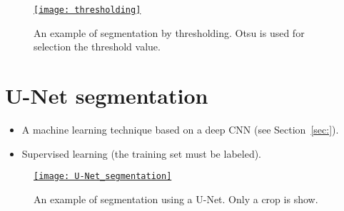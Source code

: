 \begin{figure}[H]
  \vspace{1ex}
  \centering
\href{https://github.com/vicente-gonzalez-ruiz/medical_imaging/blob/main/notebooks/thresholding.ipynb}{\texttt{[image: thresholding]}}
  \caption[An example of segmentation by thresholding.]{An example of
    segmentation by thresholding. Otsu is used for selection the
    threshold value.}
  \label{fig:thresholding}
\end{figure}

\section{U-Net segmentation \cite{ronneberger2015u}}

\begin{itemize}
\item A machine learning technique based on a deep \gls{CNN} (see Section~\ref{sec:}).
\item Supervised learning (the training set must be labeled).
\end{itemize}



\begin{figure}[H]
  \vspace{1ex}
  \centering
\href{https://github.com/vicente-gonzalez-ruiz/medical_imaging/blob/main/notebooks/unet_cell_data.ipynb}{\texttt{[image: U-Net\_segmentation]}}
  \caption[An example of segmentation using a U-Net.]{An example of
    segmentation using a U-Net. Only a crop is show.}
  \label{fig:U-Net_segmentatin}
\end{figure}

